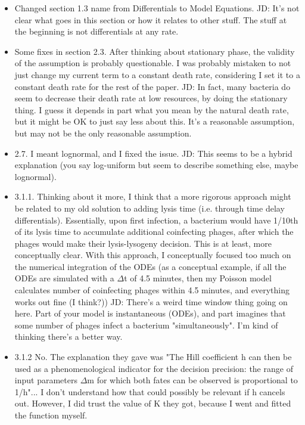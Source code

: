 \documentclass{article}
\begin{document}
\begin{itemize}
    \item Changed section 1.3 name from Differentials to Model Equations.
        \subitem JD: It's not clear what goes in this section or how it relates to other stuff. The stuff at the beginning is not differentials at any rate.
    \item Some fixes in section 2.3. After thinking about stationary phase, the validity of the assumption is probably questionable. I was probably mistaken to not just change my current term to a constant death rate, considering I set it to a constant death rate for the rest of the paper. 
        \subitem JD: In fact, many bacteria do seem to decrease their death rate at low resources, by doing the stationary thing. I guess it depends in part what you mean by the natural death rate, but it might be OK to just say less about this. It's a reasonable assumption, but may not be the only reasonable assumption.
    \item  2.7. I meant lognormal, and I fixed the issue.
        \subitem JD: This seems to be a hybrid explanation (you say log-uniform but seem to describe something else, maybe lognormal).
    \item 3.1.1. Thinking about it more, I think that a more rigorous approach might be related to my old solution to adding lysis time (i.e. through time delay differentials). Essentially, upon first infection, a bacterium would have 1/10th of its lysis time to accumulate additional coinfecting phages, after which the phages would make their lysis-lysogeny decision. This is at least, more conceptually clear. With this approach, I conceptually focused too much on the numerical integration of the ODEs (as a conceptual example, if all the ODEs are simulated with a $\Delta$t of 4.5 minutes, then my Poisson model calculates number of coinfecting phages within 4.5 minutes, and everything works out fine (I think?))
        \subitem JD: There's a weird time window thing going on here. Part of your model is instantaneous (ODEs), and part imagines that some number of phages infect a bacterium "simultaneously". I'm kind of thinking there's a better way.
    \item 3.1.2 No. The explanation they gave was "The Hill coefficient h can then be used as a phenomenological indicator for the decision precision: the range of input parameters $\Delta$m for which both fates can be observed is proportional to 1/h"... I don't understand how that could possibly be relevant if h cancels out. However, I did trust the value of K they got, because I went and fitted the function myself. 

\end{itemize}
\end{document}

